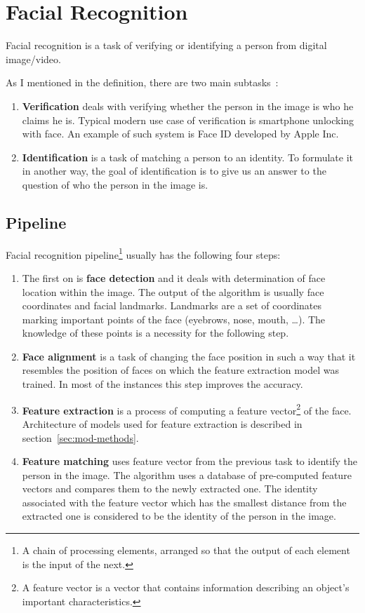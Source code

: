 \chapter{Facial Recognition}\label{ch:face-rec}
Facial recognition is a task of verifying or identifying a person from digital image/video.

As I mentioned in the definition, there are two main subtasks~\cite{FaceRec}:
\begin{enumerate}
    \item \textbf{Verification} deals with verifying whether the person in the image is who he claims he is.
    Typical modern use case of verification is smartphone unlocking with face.
    An example of such system is Face ID developed by Apple Inc.

    \item \textbf{Identification} is a task of matching a person to an identity.
    To formulate it in another way, the goal of identification is to give us an answer to the question of who the person
    in the image is.
\end{enumerate}

\section{Pipeline}\label{sec:pipeline}

Facial recognition pipeline\footnote{\label{foot:pipe}A chain of processing elements, arranged so that the output of
each element is the input of the next.} usually has the following four steps:
\begin{enumerate}
    \item The first on is \textbf{face detection} and it deals with determination of face location within the image.
    The output of the algorithm is usually face coordinates and facial landmarks.
    Landmarks are a set of coordinates marking important points of the face (eyebrows, nose, mouth, \ldots).
    The knowledge of these points is a necessity for the following step.
    \item \textbf{Face alignment} is a task of changing the face position in such a way that it resembles the position
    of faces on which the feature extraction model was trained.
    In most of the instances this step improves the accuracy.
    \item \textbf{Feature extraction} is a process of computing a feature vector\footnote{A feature vector is a vector
    that contains information describing an object's important characteristics.} of the face.
    Architecture of models used for feature extraction is described in section~\ref{sec:mod-methods}.
    \item \textbf{Feature matching} uses feature vector from the previous task to identify the person in the image.
    The algorithm uses a database of pre-computed feature vectors and compares them to the newly extracted one.
    The identity associated with the feature vector which has the smallest distance from the extracted one is
    considered to be the identity of the person in the image.
\end{enumerate}

